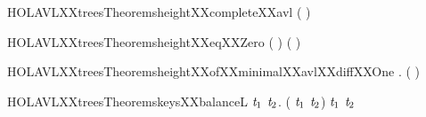 \newcommand{\HOLAVLXXtreesTheoremsheightXXbalRTwo}{\UseVerbatim{HOLAVLXXtreesTheoremsheightXXbalRTwo}}
\begin{SaveVerbatim}{HOLAVLXXtreesTheoremsheightXXcompleteXXavl}
\HOLTokenTurnstile{}  ( ) \HOLSymConst{=} 
\end{SaveVerbatim}
\newcommand{\HOLAVLXXtreesTheoremsheightXXcompleteXXavl}{\UseVerbatim{HOLAVLXXtreesTheoremsheightXXcompleteXXavl}}
\begin{SaveVerbatim}{HOLAVLXXtreesTheoremsheightXXeqXXZero}
\HOLTokenTurnstile{} (  \HOLSymConst{=}  \HOLSymConst{\HOLTokenEquiv{}}  \HOLSymConst{=} ) \HOLSymConst{\HOLTokenConj{}} ( \HOLSymConst{=}   \HOLSymConst{\HOLTokenEquiv{}}  \HOLSymConst{=} )
\end{SaveVerbatim}
\newcommand{\HOLAVLXXtreesTheoremsheightXXeqXXZero}{\UseVerbatim{HOLAVLXXtreesTheoremsheightXXeqXXZero}}
\begin{SaveVerbatim}{HOLAVLXXtreesTheoremsheightXXofXXminimalXXavlXXdiffXXOne}
\HOLTokenTurnstile{} \HOLSymConst{\HOLTokenForall{}}    .
      (     ) \HOLSymConst{\HOLTokenImp{}}
      \HOLSymConst{=}  \HOLSymConst{\HOLTokenConj{}}  \HOLSymConst{=}  \HOLSymConst{\HOLTokenDisj{}}   \HOLSymConst{=}   \HOLSymConst{\ensuremath{+}}  \HOLSymConst{\HOLTokenDisj{}}
       \HOLSymConst{=}   \HOLSymConst{\ensuremath{+}} 
\end{SaveVerbatim}
\newcommand{\HOLAVLXXtreesTheoremsheightXXofXXminimalXXavlXXdiffXXOne}{\UseVerbatim{HOLAVLXXtreesTheoremsheightXXofXXminimalXXavlXXdiffXXOne}}
\begin{SaveVerbatim}{HOLAVLXXtreesTheoremskeysXXbalanceL}
\HOLTokenTurnstile{} \HOLSymConst{\HOLTokenForall{}}  \ensuremath{\HOLBoundVar{t}\sb{\mathrm{1}}} \ensuremath{\HOLBoundVar{t}\sb{\mathrm{2}}}.
      (   \ensuremath{\HOLBoundVar{t}\sb{\mathrm{1}}} \ensuremath{\HOLBoundVar{t}\sb{\mathrm{2}}}) \HOLSymConst{=} \HOLTokenLeftbrace{}\HOLTokenRightbrace{} \HOLConst{\HOLTokenUnion{}}  \ensuremath{\HOLBoundVar{t}\sb{\mathrm{1}}} \HOLConst{\HOLTokenUnion{}}  \ensuremath{\HOLBoundVar{t}\sb{\mathrm{2}}}
\end{SaveVerbatim}
